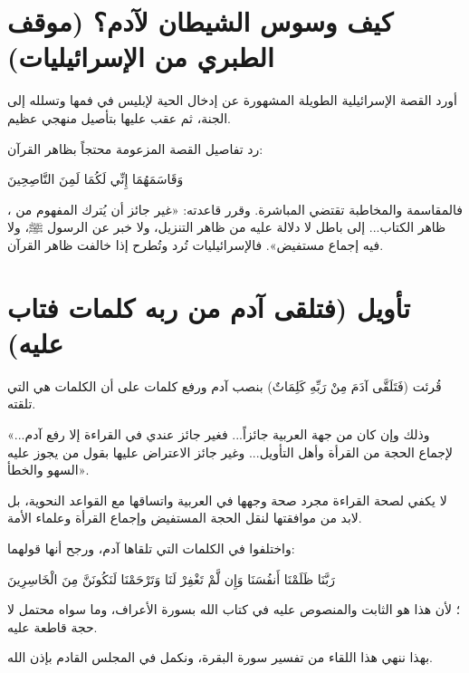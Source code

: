 \section{كيف وسوس الشيطان لآدم؟ (موقف الطبري من الإسرائيليات)}
أورد  القصة الإسرائيلية الطويلة المشهورة عن إدخال الحية لإبليس في فمها وتسلله إلى الجنة، ثم عقب عليها بتأصيل منهجي عظيم.

\begin{fawaid}
رد  تفاصيل القصة المزعومة محتجاً بظاهر القرآن: \begin{ayah}وَقَاسَمَهُمَا إِنِّي لَكُمَا لَمِنَ النَّاصِحِينَ\end{ayah}، فالمقاسمة والمخاطبة تقتضي المباشرة. وقرر قاعدته: «غير جائز أن يُترك المفهوم من ظاهر الكتاب... إلى باطل لا دلالة عليه من ظاهر التنزيل، ولا خبر عن الرسول ﷺ، ولا فيه إجماع مستفيض». فالإسرائيليات تُرد وتُطرح إذا خالفت ظاهر القرآن.
\end{fawaid}

\separator

\section{تأويل (فتلقى آدم من ربه كلمات فتاب عليه)}
قُرئت (فَتَلَقَّى آدَمَ مِنْ رَبِّهِ كَلِمَاتٌ) بنصب آدم ورفع كلمات على أن الكلمات هي التي تلقته.

 «وذلك وإن كان من جهة العربية جائزاً... فغير جائز عندي في القراءة إلا رفع آدم... لإجماع الحجة من القرأة وأهل التأويل... وغير جائز الاعتراض عليها بقول من يجوز عليه السهو والخطأ».

\begin{fawaid}
لا يكفي لصحة القراءة مجرد صحة وجهها في العربية واتساقها مع القواعد النحوية، بل لابد من موافقتها لنقل الحجة المستفيض وإجماع القرأة وعلماء الأمة.
\end{fawaid}

واختلفوا في الكلمات التي تلقاها آدم، ورجح  أنها قولهما: \begin{ayah}رَبَّنَا ظَلَمْنَا أَنفُسَنَا وَإِن لَّمْ تَغْفِرْ لَنَا وَتَرْحَمْنَا لَنَكُونَنَّ مِنَ الْخَاسِرِينَ\end{ayah}؛ لأن هذا هو الثابت والمنصوص عليه في كتاب الله بسورة الأعراف، وما سواه محتمل لا حجة قاطعة عليه.

\separator

بهذا ننهي هذا اللقاء من تفسير سورة البقرة، ونكمل في المجلس القادم بإذن الله.
